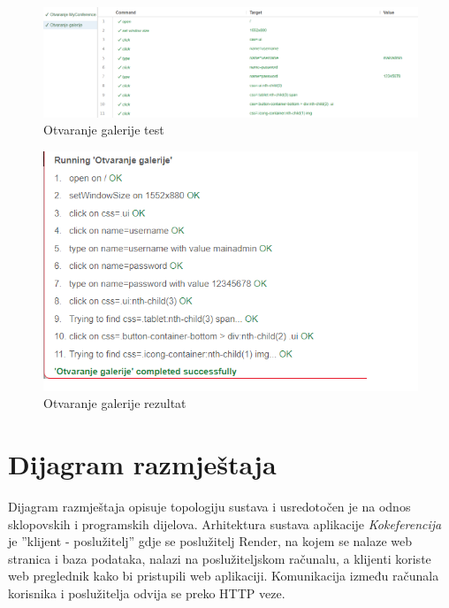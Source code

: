     \begin{figure}[H]
            \includegraphics[width = \textwidth]{slike/OtvaranjeGalerije.png}
			
			\centering
			\caption{Otvaranje galerije test}
			\label{fig:myConferenceTest}
			\end{figure}

   \begin{figure}[H]
            \includegraphics[scale = 0.8]{slike/OtvaranjeGalerijeRez.png}
			
			\centering
			\caption{Otvaranje galerije rezultat}
			\label{fig:myConferenceRez}
			\end{figure}
			
			\eject 
		
		
		\section{Dijagram razmještaja}
			
			Dijagram razmještaja opisuje topologiju sustava i usredotočen je na odnos
                sklopovskih i programskih dijelova. Arhitektura sustava aplikacije \textit{Kokeferencija} je ”klijent - poslužitelj” gdje se poslužitelj Render, na kojem se nalaze web stranica i baza podataka, nalazi na
                poslužiteljskom računalu, a klijenti koriste web preglednik kako bi pristupili web
                aplikaciji. Komunikacija između računala korisnika i poslužitelja odvija se preko 
                HTTP veze.

